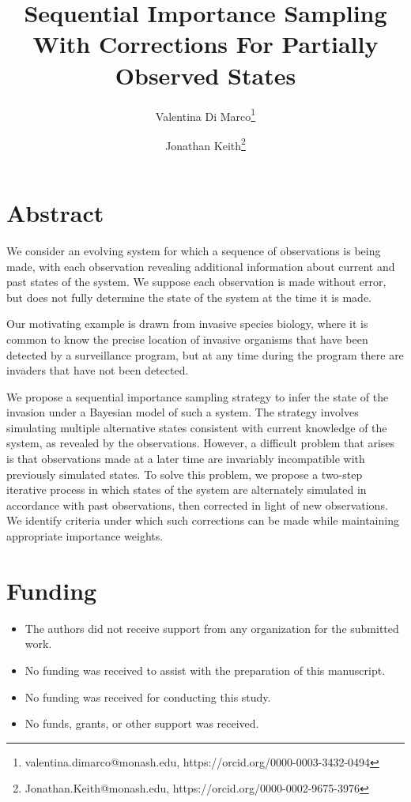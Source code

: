 \documentclass[11pt,a4paper]{article}
\title{Sequential Importance Sampling With Corrections For Partially Observed States}
\author[1]{Valentina Di Marco\thanks{valentina.dimarco@monash.edu, https://orcid.org/0000-0003-3432-0494}}
\author[2]{Jonathan Keith\thanks{Jonathan.Keith@monash.edu, https://orcid.org/0000-0002-9675-3976}}
\affil[1]{School of Mathematical Science, Monash University, Clayton Campus, VIC 3800, Australia}
\affil[2]{School of Mathematical Science, Monash University, Clayton Campus, VIC 3800, Australia}
\begin{document}
\maketitle


\section*{Abstract}
We consider an evolving system for which a sequence of observations is being made, with each observation revealing additional information about current and past states of the system. We suppose each observation is made without error, but does not fully determine the state of the system at the time it is made. 

Our motivating example is drawn from invasive species biology, where it is common to know the precise location of invasive organisms that have been detected by a surveillance program, but at any time during the program there are invaders that have not been detected.

We propose a sequential importance sampling strategy to infer the state of the invasion under a Bayesian model of such a system. The strategy involves simulating multiple alternative states consistent with current knowledge of the system, as revealed by the observations. However, a difficult problem that arises is that observations made at a later time are invariably incompatible with previously simulated states. To solve this problem, we propose a two-step iterative process in which states of the system are alternately simulated in accordance with past observations, then corrected in light of new observations. We identify criteria under which such corrections can be made while maintaining appropriate importance weights.

\section*{Funding}
\begin{itemize}
    \item The authors did not receive support from any organization for the submitted work.
    \item No funding was received to assist with the preparation of this manuscript.
    \item No funding was received for conducting this study.
    \item No funds, grants, or other support was received.
\end{itemize}
\end{document}
